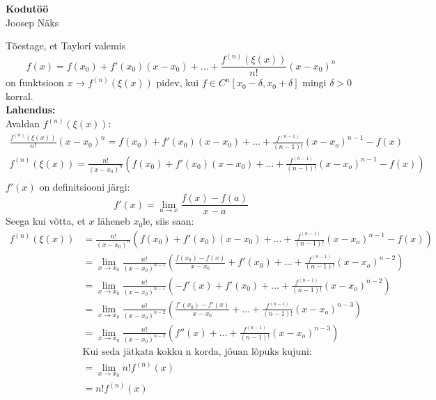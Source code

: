 \documentclass{article}
\begin{document}
\begin{center}
\Large\textbf{Kodut\"o\"o}\\
\small{Joosep N\"aks}
\end{center}
T\~oestage, et Taylori valemis
\begin{equation*}
f(x)=f(x_0)+f'(x_0)(x-x_0)+...+\frac{f^{(n)}(\xi(x))}{n!}(x-x_0)^n
\end{equation*}
on funktsioon $x\to f^{(n)}(\xi(x))$ pidev, kui $f\in C^n[x_0-\delta,x_0+\delta]$ mingi $\delta>0$ korral.\\
\textbf{Lahendus:}\\
Avaldan $f^{(n)}(\xi(x))$:
\begin{equation*}
\begin{aligned}
\frac{f^{(n)}(\xi(x))}{n!}(x-x_0)^n=f(x_0)+f'(x_0)(x-x_0)+...+\frac{f^{(n-1)}}{(n-1)!}(x-x_o)^{n-1} -f(x)\\
f^{(n)}(\xi(x))=\frac{n!}{(x-x_0)^n}\left(f(x_0)+f'(x_0)(x-x_0)+...+\frac{f^{(n-1)}}{(n-1)!}(x-x_o)^{n-1} -f(x)\right)\\
\end{aligned}
\end{equation*}
$f'(x)$ on definitsiooni j\"argi:
\begin{equation*}
f'(x)=\lim_{a\to x}\frac{f(x)-f(a)}{x-a}
\end{equation*}
Seega kui v\~otta, et $x$ l\"aheneb $x_0$le, siis saan:
\begin{equation*}
\begin{aligned}
f^{(n)}(\xi(x))&=\frac{n!}{(x-x_0)^n}\left(f(x_0)+f'(x_0)(x-x_0)+...+\frac{f^{(n-1)}}{(n-1)!}(x-x_o)^{n-1} -f(x)\right)\\
&=\lim_{x\to x_0}\frac{n!}{(x-x_0)^{n-1}}\left(\frac{f(x_0)-f(x)}{x-x_0}+f'(x_0)+...+\frac{f^{(n-1)}}{(n-1)!}(x-x_o)^{n-2}\right)\\
&=\lim_{x\to x_0}\frac{n!}{(x-x_0)^{n-1}}\left(-f'(x)+f'(x_0)+...+\frac{f^{(n-1)}}{(n-1)!}(x-x_o)^{n-2}\right)\\
&=\lim_{x\to x_0}\frac{n!}{(x-x_0)^{n-2}}\left(\frac{f'(x_0)-f'(x)}{x-x_0}+...+\frac{f^{(n-1)}}{(n-1)!}(x-x_o)^{n-3}\right)\\
&=\lim_{x\to x_0}\frac{n!}{(x-x_0)^{n-2}}\left(f''(x)+...+\frac{f^{(n-1)}}{(n-1)!}(x-x_o)^{n-3}\right)\\
&\text{Kui seda j\"atkata kokku n korda, j\~ouan l\~opuks kujuni:}\\
&=\lim_{x\to x_0}n!f^{(n)}(x)\\
&= n!f^{(n)}(x) \\
\end{aligned}
\end{equation*}
\end{document}
